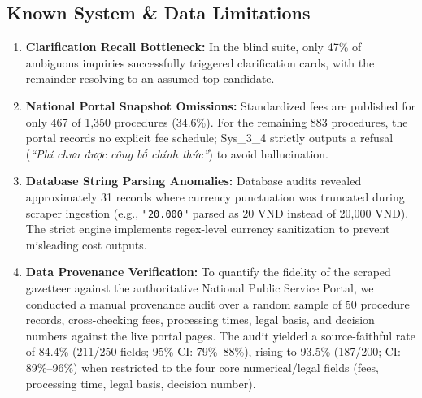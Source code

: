 \documentclass[11pt,a4paper]{article}
\newcommand{\sys}{\mbox{Sys\_3\_4}}
\begin{document}
\subsection{Known System \& Data Limitations}
\begin{enumerate}[label=\arabic*.]
\item \textbf{Clarification Recall Bottleneck:} In the blind suite, only 47\% of ambiguous inquiries
successfully triggered clarification cards, with the remainder resolving to an assumed top candidate.
\item \textbf{National Portal Snapshot Omissions:} Standardized fees are published for only 467 of 1,350
procedures (34.6\%). For the remaining 883 procedures, the portal records no explicit fee schedule;
\sys{} strictly outputs a refusal (\emph{``Phí chưa được công bố chính thức''}) to avoid hallucination.
\item \textbf{Database String Parsing Anomalies:} Database audits revealed approximately 31 records where
currency punctuation was truncated during scraper ingestion (e.g., \texttt{"20.000"} parsed as 20 VND
instead of 20,000 VND). The strict engine implements regex-level currency sanitization to prevent
misleading cost outputs.
\item \textbf{Data Provenance Verification:} To quantify the fidelity of the scraped
gazetteer against the authoritative National Public Service Portal, we conducted a manual
provenance audit over a random sample of 50 procedure records, cross-checking fees,
processing times, legal basis, and decision numbers against the live portal pages. The
audit yielded a source-faithful rate of 84.4\% (211/250 fields; 95\% CI: 79\%--88\%),
rising to 93.5\% (187/200; CI: 89\%--96\%) when restricted to the four core
numerical/legal fields (fees, processing time, legal basis, decision number).
\end{enumerate}

\end{document}
